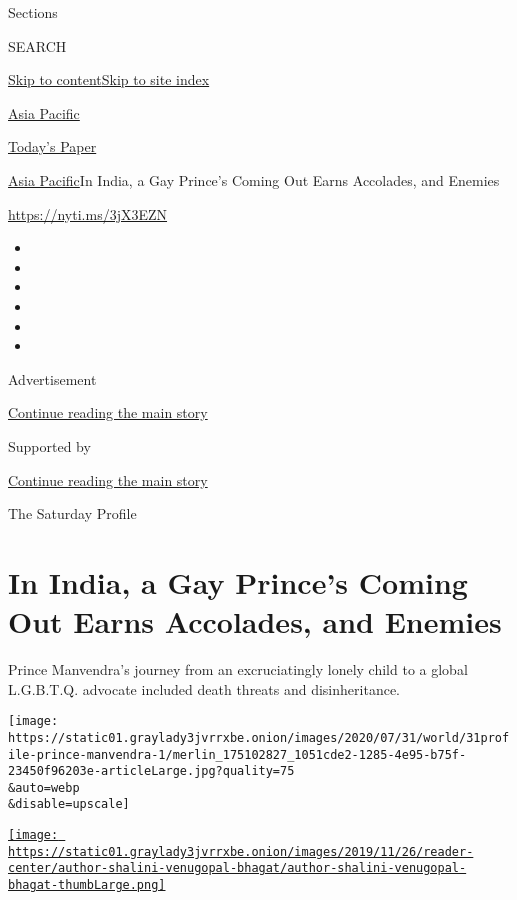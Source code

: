 Sections

SEARCH

\protect\hyperlink{site-content}{Skip to
content}\protect\hyperlink{site-index}{Skip to site index}

\href{https://www.nytimes3xbfgragh.onion/section/world/asia}{Asia
Pacific}

\href{https://myaccount.nytimes3xbfgragh.onion/auth/login?response_type=cookie\&client_id=vi}{}

\href{https://www.nytimes3xbfgragh.onion/section/todayspaper}{Today's
Paper}

\href{/section/world/asia}{Asia Pacific}\textbar{}In India, a Gay
Prince's Coming Out Earns Accolades, and Enemies

\url{https://nyti.ms/3jX3EZN}

\begin{itemize}
\item
\item
\item
\item
\item
\item
\end{itemize}

Advertisement

\protect\hyperlink{after-top}{Continue reading the main story}

Supported by

\protect\hyperlink{after-sponsor}{Continue reading the main story}

The Saturday Profile

\hypertarget{in-india-a-gay-princes-coming-out-earns-accolades-and-enemies}{%
\section{In India, a Gay Prince's Coming Out Earns Accolades, and
Enemies}\label{in-india-a-gay-princes-coming-out-earns-accolades-and-enemies}}

Prince Manvendra's journey from an excruciatingly lonely child to a
global L.G.B.T.Q. advocate included death threats and disinheritance.

\texttt{[image: https://static01.graylady3jvrrxbe.onion/images/2020/07/31/world/31profile-prince-manvendra-1/merlin\_175102827\_1051cde2-1285-4e95-b75f-23450f96203e-articleLarge.jpg?quality=75\\\&auto=webp\\\&disable=upscale]}

\href{https://www.nytimes3xbfgragh.onion/by/shalini-venugopal-bhagat}{\texttt{[image: https://static01.graylady3jvrrxbe.onion/images/2019/11/26/reader-center/author-shalini-venugopal-bhagat/author-shalini-venugopal-bhagat-thumbLarge.png]}}

